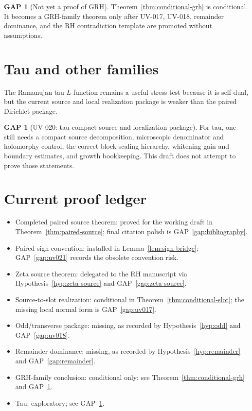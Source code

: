 \documentclass[11pt,a4paper]{amsart}
\theoremstyle{plain}
\theoremstyle{definition}
\newtheorem{gap}[theorem]{GAP}
\begin{document}
\begin{gap}[Not yet a proof of GRH]
\label{gap:not-grh}
Theorem~\ref{thm:conditional-grh} is conditional.  It becomes a GRH-family
theorem only after UV-017, UV-018, remainder dominance, and the RH contradiction
template are promoted without assumptions.
\end{gap}

\section{Tau and other families}
\label{sec:tau}

The Ramanujan tau \(L\)-function remains a useful stress test because it is
self-dual, but the current source and local realization package is weaker than
the paired Dirichlet package.

\begin{gap}[UV-020: tau compact source and localization package]
\label{gap:uv020}
For tau, one still needs a compact source decomposition, microscopic
denominator and holomorphy control, the correct block scaling hierarchy,
whitening gain and boundary estimates, and growth bookkeeping.  This draft
does not attempt to prove those statements.
\end{gap}

\section{Current proof ledger}
\label{sec:ledger}

\begin{itemize}
\item Completed paired source theorem: proved for the working draft in
Theorem~\ref{thm:paired-source}; final citation polish is
GAP~\ref{gap:bibliography}.
\item Paired sign convention: installed in Lemma~\ref{lem:sign-bridge};
GAP~\ref{gap:uv021} records the obsolete convention risk.
\item Zeta source theorem: delegated to the RH manuscript via
Hypothesis~\ref{hyp:zeta-source} and GAP~\ref{gap:zeta-source}.
\item Source-to-slot realization: conditional in
Theorem~\ref{thm:conditional-slot}; the missing local normal form is
GAP~\ref{gap:uv017}.
\item Odd/transverse package: missing, as recorded by
Hypothesis~\ref{hyp:odd} and GAP~\ref{gap:uv018}.
\item Remainder dominance: missing, as recorded by
Hypothesis~\ref{hyp:remainder} and GAP~\ref{gap:remainder}.
\item GRH-family conclusion: conditional only; see
Theorem~\ref{thm:conditional-grh} and GAP~\ref{gap:not-grh}.
\item Tau: exploratory; see GAP~\ref{gap:uv020}.
\end{itemize}
\end{document}

